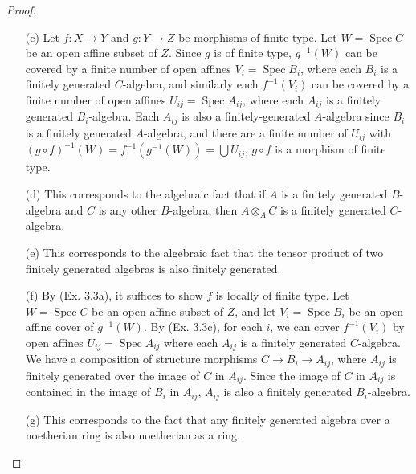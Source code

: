 \documentclass{article}
\DeclareMathOperator{\spec}{Spec}
\begin{document}
\begin{enumerate} [label=\textbf{\arabic*.}, leftmargin=0em]
\begin{proof}
\begin{itemize} [leftmargin=0cm]
    \item[(c)] Let $f : X \to Y$ and $g : Y \to Z$ be morphisms of finite type. Let $W = \spec{C}$ be an open affine subset of $Z$. Since $g$ is of finite type, $g^{-1}(W)$ can be covered by a finite number of open affines $V_i = \spec{B_i}$, where each $B_i$ is a finitely generated $C$-algebra, and similarly each $f^{-1}(V_i)$ can be covered by a finite number of open affines $U_{ij} = \spec{A_{ij}}$, where each $A_{ij}$ is a finitely generated $B_i$-algebra. Each $A_{ij}$ is also a finitely-generated $A$-algebra since $B_i$ is a finitely generated $A$-algebra, and there are a finite number of $U_{ij}$ with $(g \circ f)^{-1}(W) = f^{-1}(g^{-1}(W)) = \bigcup U_{ij}$, $g \circ f$ is a morphism of finite type.

    \item[(d)] This corresponds to the algebraic fact that if $A$ is a finitely generated $B$-algebra and $C$ is any other $B$-algebra, then $A \otimes_A C$ is a finitely generated $C$-algebra.

    \item[(e)] This corresponds to the algebraic fact that the tensor product of two finitely generated algebras is also finitely generated.

    \item[(f)] By (Ex. 3.3a), it suffices to show $f$ is locally of finite type. Let $W = \spec{C}$ be an open affine subset of $Z$, and let $V_i = \spec{B_i}$ be an open affine cover of $g^{-1}(W)$. By (Ex. 3.3c), for each $i$, we can cover $f^{-1}(V_i)$ by open affines $U_{ij} = \spec{A_{ij}}$ where each $A_{ij}$ is a finitely generated $C$-algebra. We have a composition of structure morphisms $C \to B_i \to A_{ij}$, where $A_{ij}$ is finitely generated over the image of $C$ in $A_{ij}$. Since the image of $C$ in $A_{ij}$ is contained in the image of $B_i$ in $A_{ij}$, $A_{ij}$ is also a finitely generated $B_i$-algebra.

    \item[(g)] This corresponds to the fact that any finitely generated algebra over a noetherian ring is also noetherian as a ring.
   \end{itemize} 
\end{proof}


\end{enumerate}
\end{document}
